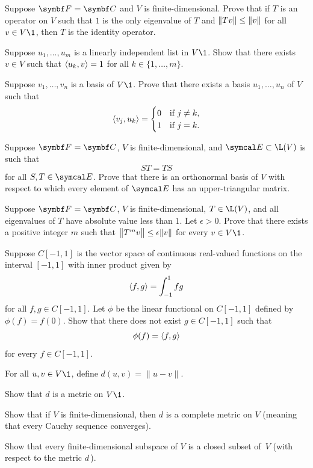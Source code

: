 \begin{exercises}
\exercise
Suppose $\F{} = \C{}$ and $V$ is finite-dimensional. Prove that if $T$ is an operator on $V$ such that $1$ is the only eigenvalue of $T$ and $\norm{Tv} \le \norm{v}$ for all $v \in V\1$, then $T$ is the identity operator.


\exercise
Suppose $u_1, \dots, u_m$ is a linearly independent list in $V\1$. Show that there exists $v \in V$ such that $\ip{u_k, v} =1$
for all $k \in \{1, \dots, m\}$.


\exercise
Suppose $v_1, \ldots, v_n$ is a basis of $V\1$. Prove that there exists a basis $u_1, \ldots, u_n$ of $V$ such that
\[
\ip{v_j, u_k} = \begin{cases}
0 & \text{if } j \ne k, \\
1 & \text{if } j=k.
\end{cases}
\]
\vspace{-.19in}


\exercise
Suppose $\F{}=\C{}$, $V$ is finite-dimensional, and $\E \subset \L(V)$ is such that \[ST = TS\] for all $S, T \in \E$. Prove that there is an orthonormal basis of $V$ with respect to which every element of $\E$ has an upper-triangular matrix.%
 \label{3Schur}


\exercise
Suppose $\F{} = \C{}$, $V$ is finite-dimensional, $T \in \L(V)$, and all eigenvalues of $T$ have absolute value less than $1$. Let $\epsilon > 0$. Prove that there exists a positive integer $m$ such that
$\norm[\big]{T^m v} \le \epsilon \|v\|$ for every $v \in V\1$.


\exercise
Suppose $C[-1, 1]$ is the vector space of continuous real-valued functions on the interval $[-1 ,1]$ with inner product given by 
\[
\ip{f, g} = \int_{-1}^1 fg
\]
for all $f, g \in C[-1, 1]$. Let $\phi$ be the linear functional on $C[-1, 1]$ defined by $\phi(f) = f(0)$. Show that there does not exist $g \in C[-1, 1]$ such that
\[
\phi(f) = \ip{f, g}
\]
for every $f \in C[-1, 1]$.


\exercise
For all $u, v \in V\1$, define $d(u, v) = \|u - v\|$.\label{4metric}
\begin{subtheorem}
\item
Show that $d$ is a metric on $V\1$.
\item
Show that if $V$ is finite-dimensional, then $d$ is a complete metric on $V$ (meaning that every Cauchy sequence converges).
\item
Show that every finite-dimensional subspace of $V$ is a closed subset of~$V$ (with respect to the metric $d$\,).
\end{subtheorem}


\end{exercises}


